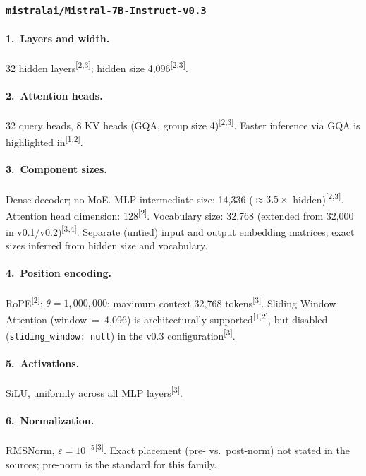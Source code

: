 \documentclass[11pt, a4paper]{article}
\newcommand{\src}[1]{\textsuperscript{\normalfont\small[#1]}}
\begin{document}
\subsubsection{\texttt{mistralai/Mistral-7B-Instruct-v0.3}}

\paragraph{1.~Layers and width.}
32 hidden layers\src{2,3}; hidden size 4,096\src{2,3}.

\paragraph{2.~Attention heads.}
32 query heads, 8 KV heads (GQA, group size 4)\src{2,3}.
Faster inference via GQA is highlighted in\src{1,2}.

\paragraph{3.~Component sizes.}
Dense decoder; no MoE.
MLP intermediate size: 14,336 ($\approx3.5\times$ hidden)\src{2,3}.
Attention head dimension: 128\src{2}.
Vocabulary size: 32,768 (extended from 32,000 in v0.1/v0.2)\src{3,4}.
Separate (untied) input and output embedding matrices; exact sizes inferred from
hidden size and vocabulary.

\paragraph{4.~Position encoding.}
RoPE\src{2}; $\theta=1{,}000{,}000$; maximum context 32,768 tokens\src{3}.
Sliding Window Attention (window~=~4,096) is architecturally
supported\src{1,2}, but disabled (\texttt{sliding\_window: null}) in the v0.3
configuration\src{3}.

\paragraph{5.~Activations.}
SiLU, uniformly across all MLP layers\src{3}.

\paragraph{6.~Normalization.}
RMSNorm, $\varepsilon=10^{-5}$\src{3}.
Exact placement (pre- vs.\ post-norm) not stated in the sources; pre-norm is
the standard for this family.
\end{document}
